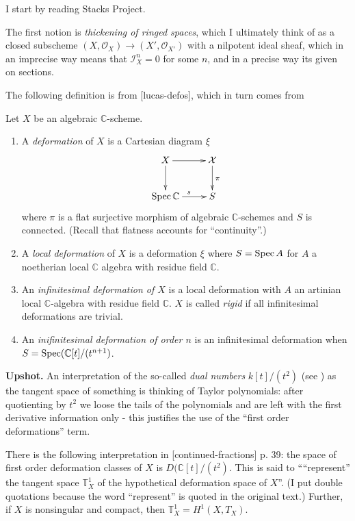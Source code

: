 \noindent
I start by reading Stacks Project.

\medskip\noindent
The first notion is {\it thickening of ringed
spaces},
which I ultimately think of as a closed
subscheme
$(X,\mathcal{O}_X) \to (X',\mathcal{O}_{X'})$
with a nilpotent ideal sheaf,
which in an imprecise way means
that $\mathcal{I}_X^n=0$ for some $n$,
and in a precise way its given on sections.

\medskip\noindent
The following definition is from
[lucas-defos], which in turn comes from
\cite{Sernesi-deformations}

\begin{definition}
\label{definition-deformation}
Let $X$ be an algebraic $\mathbb{C}$-scheme.
\begin{enumerate}
\item A {\it deformation} of $X$ is a
Cartesian diagram $\xi$
$$
\xymatrix{
X\ar[r]\ar[d]&\mathcal{X}\ar[d]^{\pi}\\
\Spec \mathbb{C}\ar[r]^s&S
}
$$
where $\pi$ is a flat surjective morphism of
algebraic $\mathbb{C}$-schemes and
$S$ is connected. (Recall that flatness
accounts for ``continuity''.)
\item A {\it local deformation} of $X$ is a
deformation $\xi$ where
$S=\mathop{\mathrm{Spec}} A$ for $A$ a noetherian local
$\mathbb{C}$ algebra with residue
field $\mathbb{C}$.
\item An {\it infinitesimal deformation of
$X$} is a local deformation with $A$
an artinian local $\mathbb{C}$-algebra with
residue field $\mathbb{C}$. $X$ is
called {\it rigid} if all infinitesimal
deformations are trivial.
\item An {\it inifinitesimal deformation of
order $n$} is an infinitesimal
deformation when $S=\mathop{\mathrm{Spec}}
(\mathbb{C}[t]/(t^{n+1})$.
\end{enumerate}
\end{definition}

{\bf Upshot.} An interpretation of the
so-called {\it dual numbers}
$k[t]/(t^2)$ (see
\cite{Hartshorne-deformation}) as the tangent
space of
something is thinking of Taylor polynomials:
after quotienting by $t^2$ we loose
the tails of the polynomials and are left
with the first derivative information
only - this justifies the use of the ``first
order deformations'' term.

There is the following interpretation in
[continued-fractions] p. 39: the space
of first order deformation classes of $X$ is
$D(\mathbb{C}[t]/(t^2)$. This is
said to ````represent'' the tangent space
$\mathbb{T}^1_X$ of the hypothetical
deformation space of $X$''. (I put double
quotations because the word
``represent'' is quoted in the original
text.) Further, if $X$ is nonsingular
and compact, then
$\mathbb{T}^1_X=H^{1}(X,T_X)$.

